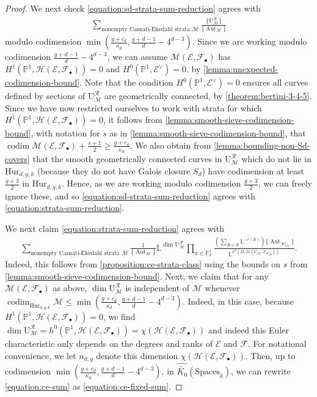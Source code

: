 \documentclass[12 pt]{amsart}
\newcommand{\rboxed}[1]{#1}
\theoremstyle{plain}
\theoremstyle{definition}
\theoremstyle{remark}
\numberwithin{equation}{section}
\newcommand\bl{\mathbb L}
\newcommand\bp{\mathbb P}
\newcommand\sce{\mathscr E}
\newcommand\scf{\mathscr F}
\newcommand\sch{\mathscr H}
\newcommand\bighurg[3]{\overline{\mathrm{Hur}}_{#1,#2, #3}} %
\newcommand\hur[3]{\mathrm{Hur}_{#1,#2,#3}} %
\newcommand\ce{\mathscr M} %
\newcommand\ramlocus[2]{\mathrm{U}_{#1}^{#2}} %
\newcommand\systemdim[2]{n_{#1,#2}} %
\newcommand\grcSpaces{\widehat{\widetilde{K_0}}(\mathrm{Spaces}_k)} %
\DeclareMathOperator\codim{codim}
\DeclareMathOperator\aut{Aut}
\begin{document}
\begin{proof}
	We next check \eqref{equation:sd-strata-sum-reduction} agrees with
	\begin{align} 
		\label{equation:strata-sum-reduction}	
		\sum_{\text{nonempty Casnati-Ekedahl strata }\ce}
	\frac{\{\ramlocus \ce {\mathcal R}\}}{\{\aut_{\ce}\}} \end{align} 
modulo codimension
$\min(\frac{g + c_d}{\kappa_d}, \frac{g + d-1}{d} - 4^{d-3})$.  
Since
we are working modulo codimension $\frac{g + d-1}{d} - 4^{d-3}$, we can assume
$\ce(\sce, \scf_\bullet)$ has $H^1(\bp^1, \sch(\sce, \scf_\bullet)) =0$ and
$H^0(\bp^1, \sce^\vee) = 0$, by \autoref{lemma:unexpected-codimension-bound}.
Note that the condition $H^0(\bp^1, \sce^\vee) = 0$ ensures all curves
defined by sections of $\ramlocus \ce {\mathcal R}$ are geometrically connected,
by \autoref{theorem:bertini-3-4-5}.  Since we have now restricted ourselves to
work with strata for which
$H^1(\bp^1, \sch(\sce, \scf_\bullet)) = 0$, it follows from
\autoref{lemma:smooth-sieve-codimension-bound}, with notation for $s$ as in
\autoref{lemma:smooth-sieve-codimension-bound}, that $\codim \ce(\sce,
\scf_\bullet) + \frac{s + 1}{2} \geq \frac{g + c_d}{\kappa_d}$.  We also
obtain from \autoref{lemma:bounding-non-Sd-covers} that the smooth geometrically
connected curves in $\ramlocus{\ce}{\mathcal R}$ which do not lie in $\hur d g
k$ (because they do not have Galois closure $S_d$) have codimension at least
$\frac{g + 3}{2}$ in $\hur d g k$.  Hence, as we are working modulo codimension
$\frac{g+3}{2}$, we can freely ignore these, and so
\eqref{equation:sd-strata-sum-reduction}
agrees with \eqref{equation:strata-sum-reduction}.

We next claim \eqref{equation:strata-sum-reduction} agrees with
	\begin{align} \label{equation:ce-sum} \sum_{\text{
		nonempty Casnati-Ekedahl strata }\ce} \frac{1}{\{\aut_{\ce}\}} \bl^{\dim
		\ramlocus \ce {\mathcal R}} \prod_{x \in \bp^1_k} \frac{\left(
		\sum_{R \in \mathcal R} \bl^{-r(R)} \right)
	\{\aut_{\ce|_D}\}}{\bl^{h^0(D, \sch(\sce|_D, \scf_\bullet|_D))}}.
\end{align} 
Indeed, this follows from \autoref{proposition:ce-strata-class} 
using the bounds on $s$ from \autoref{lemma:smooth-sieve-codimension-bound}.
		Next, we claim that for any $\ce(\sce, \scf_\bullet)$ as above, $\dim
	\ramlocus \ce {\mathcal R}$ is independent of $\ce$ whenever
	$\codim_{\bighurg d g k} \ce \leq \min(\frac{g + c_d}{\kappa_d}, \frac{g
	+ d-1}{d} - 4^{d-3})$.  Indeed, in this case, because $H^1(\bp^1,
	\sch(\sce, \scf_\bullet)) =0$, we find $\dim \ramlocus \ce {\mathcal R}
	= h^0(\bp^1, \sch(\sce, \scf_\bullet)) = \chi\left( \sch(\sce,
	\scf_\bullet) \right)$ and indeed this Euler characteristic only
		depends on the degrees and ranks of $\sce$ and $\scf$.  For
		notational convenience, we let $\rboxed{\systemdim d g}$ denote
		this dimension $\chi\left( \sch(\sce, \scf_\bullet )\right).$
			Then, up to codimension $\min(\frac{g +
			c_d}{\kappa_d}, \frac{g + d-1}{d} - 4^{d-3})$, in
			$\grcSpaces$, we can rewrite \eqref{equation:ce-sum} as
			\eqref{equation:ce-fixed-sum}.


\end{proof}
\end{document}
